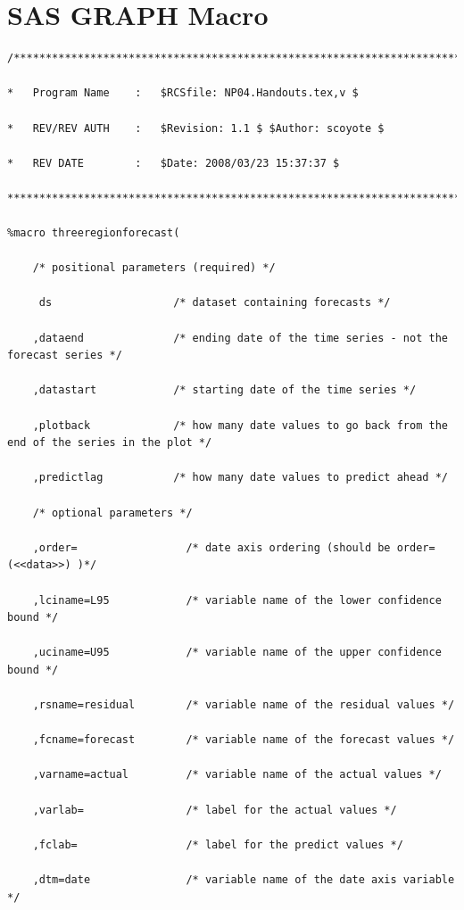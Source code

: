 \documentclass[10pt]{sugconf-ish}
\begin{document}
\section{SAS GRAPH Macro}
\scriptsize
\begin{verbatim}
/**********************************************************************

*   Program Name    :   $RCSfile: NP04.Handouts.tex,v $

*   REV/REV AUTH    :   $Revision: 1.1 $ $Author: scoyote $

*   REV DATE        :   $Date: 2008/03/23 15:37:37 $

***********************************************************************/ 

%macro threeregionforecast(

    /* positional parameters (required) */

     ds                   /* dataset containing forecasts */

    ,dataend              /* ending date of the time series - not the forecast series */

    ,datastart            /* starting date of the time series */

    ,plotback             /* how many date values to go back from the end of the series in the plot */

    ,predictlag           /* how many date values to predict ahead */

    /* optional parameters */

    ,order=                 /* date axis ordering (should be order=(<<data>>) )*/

    ,lciname=L95            /* variable name of the lower confidence bound */

    ,uciname=U95            /* variable name of the upper confidence bound */

    ,rsname=residual        /* variable name of the residual values */

    ,fcname=forecast        /* variable name of the forecast values */

    ,varname=actual         /* variable name of the actual values */

    ,varlab=                /* label for the actual values */

    ,fclab=                 /* label for the predict values */

    ,dtm=date               /* variable name of the date axis variable */


\end{verbatim}
\end{document}
